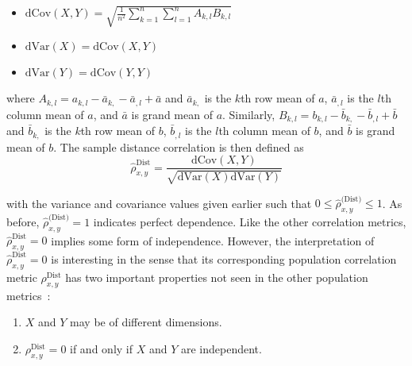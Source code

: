 \tablespacing
\begin{itemize}
	\item $\mathrm{dCov}(X,Y) = \sqrt{\frac{1}{n^2} \sum\limits_{k=1}^{n} 
	\sum\limits_{l=1}^{n} A_{k,l} B_{k,l}}$
	\item $\mathrm{dVar}(X) = \mathrm{dCov}(X,Y)$
	\item $\mathrm{dVar}(Y) = \mathrm{dCov}(Y,Y)$
\end{itemize}
\bodyspacing

\noindent where $A_{k,l}=a_{k,l}-\bar{a}_{k,}-\bar{a}_{,l}+\bar{a}$ and 
$\bar{a}_{k,}$ is the $k$th row mean of $a$, $\bar{a}_{,l}$ is the $l$th column 
mean of $a$, and $\bar{a}$ is grand mean of $a$. 
Similarly, $B_{k,l}=b_{k,l}-\bar{b}_{k,}-\bar{b}_{,l}+\bar{b}$ and 
$\bar{b}_{k,}$ is the $k$th row mean of $b$, $\bar{b}_{,l}$ is the $l$th column 
mean of $b$, and $\bar{b}$ is grand mean of $b$. The sample distance 
correlation is then defined as
$$\hat{\rho}_{x,y}^{\text{Dist}}=\frac{\mathrm{dCov}(X,Y)}
{\sqrt{\mathrm{dVar}(X)\mathrm{dVar}(Y)}}$$

\noindent with the variance and covariance values given earlier such that 
$0 \leq \hat{\rho}_{x,y}^{\text{(Dist)}} \leq 1$. As before, 
$\hat{\rho}_{x,y}^{\text{(Dist)}}=1$ indicates perfect dependence. 
Like the other correlation metrics, $\hat{\rho}_{x,y}^{\text{Dist}}=0$ implies 
some form of independence. 
However, the interpretation of $\hat{\rho}_{x,y}^{\text{Dist}}=0$ is
interesting in the sense that its corresponding population correlation metric
$\rho_{x,y}^{\text{Dist}}$ has two important properties not seen in the other 
population metrics~\cite{szekely2007}: 

\tablespacing
\begin{enumerate}
	\item $X$ and $Y$ may be of different dimensions.
	\item$\rho_{x,y}^{\text{Dist}}=0$ if and only if $X$ and $Y$ are 
	independent.
\end{enumerate}
\bodyspacing


